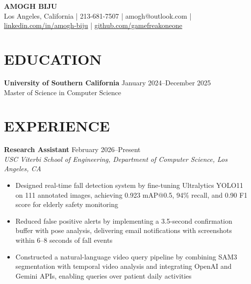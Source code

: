 \documentclass[10pt,letterpaper]{article}
\begin{document}
\begin{center}
    {\LARGE \textbf{AMOGH BIJU}}\\[2pt]
    Los Angeles, California | 213-681-7507 | amogh@outlook.com | \href{https://www.linkedin.com/in/amogh-biju/}{linkedin.com/in/amogh-biju} | \href{https://github.com/gamefreakoneone}{github.com/gamefreakoneone}
\end{center}

\vspace{-10pt}

\section*{EDUCATION}
\textbf{University of Southern California} \hfill January 2024--December 2025\\
Master of Science in Computer Science

\vspace{-6pt}

\section*{EXPERIENCE}

\textbf{Research Assistant} \hfill February 2026--Present\\
\textit{USC Viterbi School of Engineering, Department of Computer Science, Los Angeles, CA}
\begin{itemize}
    \item Designed real-time fall detection system by fine-tuning Ultralytics YOLO11 on 111 annotated images, achieving 0.923 mAP@0.5, 94\% recall, and 0.90 F1 score for elderly safety monitoring
    \item Reduced false positive alerts by implementing a 3.5-second confirmation buffer with pose analysis, delivering email notifications with screenshots within 6--8 seconds of fall events
    \item Constructed a natural-language video query pipeline by combining SAM3 segmentation with temporal video analysis and integrating OpenAI and Gemini APIs, enabling queries over patient daily activities
\end{itemize}

\vspace{-2pt}
\end{document}
